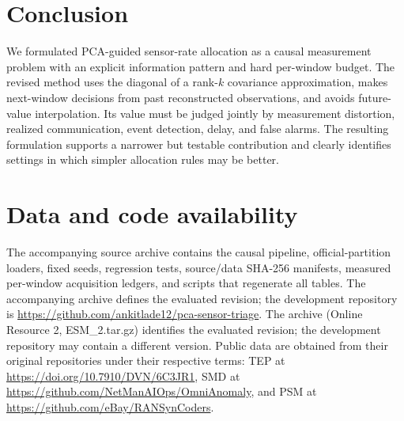 \documentclass[pdflatex,sn-vancouver-num]{sn-jnl}
\theoremstyle{thmstyleone}
\begin{document}
\section{Conclusion}

We formulated PCA-guided sensor-rate allocation as a causal measurement
problem with an explicit information pattern and hard per-window budget. The
revised method uses the diagonal of a rank-$k$ covariance approximation, makes
next-window decisions from past reconstructed observations, and avoids future-
value interpolation. Its value must be judged jointly by measurement
distortion, realized communication, event detection, delay, and false alarms.
The resulting formulation supports a narrower but testable contribution and
clearly identifies settings in which simpler allocation rules may be better.

\section*{Data and code availability}
The accompanying source archive contains the causal pipeline, official-partition
loaders, fixed seeds, regression tests, source/data SHA-256 manifests, measured
per-window acquisition ledgers, and scripts that regenerate all tables.
The accompanying archive defines the evaluated revision; the development repository is \url{https://github.com/ankitlade12/pca-sensor-triage}.
The archive (Online Resource 2, ESM\_2.tar.gz) identifies the evaluated revision;
the development repository may contain a different version. Public data are obtained
from their original repositories under their respective terms:
TEP at \url{https://doi.org/10.7910/DVN/6C3JR1},
SMD at \url{https://github.com/NetManAIOps/OmniAnomaly}, and
PSM at \url{https://github.com/eBay/RANSynCoders}.

\clearpage
\end{document}
